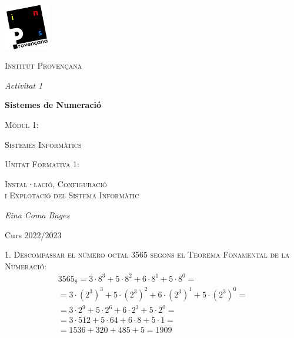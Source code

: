 \documentclass[a4paper,12pt]{report}
\begin{document}
\begin{titlepage}
	\centering
	\includegraphics*[width=0.15\textwidth]{provencana_color.pdf}
	\par\vspace{0.5cm}

	{\scshape\Large Institut Provençana \par}

	\vspace{1cm}
	
	{\itshape\Large Activitat 1 \par}
	{\bfseries\LARGE Sistemes de Numeració \par}
	
	\vspace{1cm}

	{\scshape\large Mòdul 1: \par}
	{\scshape\Large Sistemes Informàtics \par}

	\vspace{0.5cm}
	
	{\scshape\normalsize Unitat Formativa 1: \par}
	{\scshape\large Instal·lació, Configuració \\ i Explotació del Sistema Informàtic\par}

	\vfill
	{\Large\itshape Eina Coma Bages\par}
	
	\vfill
	Curs 2022/2023

\end{titlepage}

\textsc{{\large 1.}  Descompassar el número octal 3565 segons el Teorema Fonamental de la Numeració:}
\vspace{-5pt}
\begin{gather*}
	3565_8 = 3\cdot8^3 + 5\cdot8^2 + 6\cdot8^1 + 5\cdot8^0 = \\
	= 3\cdot(2^3)^3 + 5\cdot(2^3)^2 + 6\cdot(2^3)^1 + 5\cdot(2^3)^0 = \\
	= 3\cdot2^9 + 5\cdot2^6 + 6\cdot2^3 + 5\cdot2^0 = \\
	= 3\cdot512 + 5\cdot64 + 6\cdot8 + 5\cdot1 = \\
	= 1536 + 320 + 485 + 5 = 1909 
\end{gather*}
\end{document}
